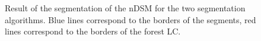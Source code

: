 \begin{figure}[htbp]
\begin{center}
\begingroup
\captionsetup[subfigure]{width=0.4\textwidth}
\hspace*{0.05\textwidth}
\endgroup
\caption{Result of the segmentation of the nDSM for the two segmentation algorithms. Blue lines correspond to the borders of the segments, red lines correspond to the borders of the forest LC.}
\label{fig:seg_nDSM}
\end{center}
\end{figure}

